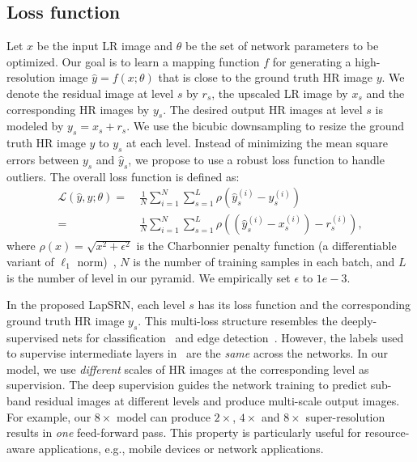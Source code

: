 \documentclass[10pt,twocolumn,letterpaper]{article}
\begin{document}
	\subsection{Loss function}
	Let $x$ be the input LR image and $\theta$ be the set of network parameters to be optimized.
	Our goal is to learn a mapping function $f$ for generating a high-resolution image $\hat{y} = f(x; \theta)$ that is close to the ground truth HR image $y$.
	We denote the residual image at level $s$ by $r_s$, the upscaled LR image by $x_s$ and the corresponding HR images by $y_s$.
	The desired output HR images at level $s$ is modeled by $y_s = x_s + r_s$.
	We use the bicubic downsampling to resize the ground truth HR image $y$ to $y_s$ at each level.
	Instead of minimizing the mean square errors between $y_s$ and $\hat{y}_s$, we propose to use a robust loss function to handle outliers.
	The overall loss function is defined as:
	\begin{align}
	\mathcal{L}(\hat{y}, y; \theta) 
	=&~ \frac{1}{N} \sum_{i=1}^N\sum_{s=1}^L \rho\left( \hat{y}_s^{(i)} - y_s^{(i)} \right) \nonumber\\
	=&~ \frac{1}{N} \sum_{i=1}^N\sum_{s=1}^L \rho\left( (\hat{y}_s^{(i)} - x_s^{(i)}) - r_s^{(i)} \right),
	\end{align}
	where $\rho(x) = \sqrt{x^2 + \epsilon^2}$ is the Charbonnier penalty function (a differentiable variant of $\ell_1$ norm)~\cite{Bruhn-IJCV-2005}, 
	$N$ is the number of training samples in each batch,
	and $L$ is the number of level in our pyramid.
	We empirically set $\epsilon$ to $1e-3$.
	
	
	In the proposed LapSRN, each level $s$ has its loss function and the corresponding ground truth HR image $y_s$.
	This multi-loss structure resembles the deeply-supervised nets for classification~\cite{Lee-AISTATS-2015} and edge detection~\cite{Xie-CVPR-2015}.
	However, the labels used to supervise intermediate layers in~\cite{Lee-AISTATS-2015,Xie-CVPR-2015} are the \emph{same} across the networks.
	In our model, we use \emph{different} scales of HR images at the corresponding level as supervision.
	The deep supervision guides the network training to predict sub-band residual images at different levels and produce multi-scale output images.
	For example, 
	our $8\times$ model can produce $2\times$, $4\times$ and $8\times$ super-resolution results in \emph{one} feed-forward pass.
	This property is particularly useful for resource-aware applications, e.g., mobile devices or network applications.
	
\end{document}
